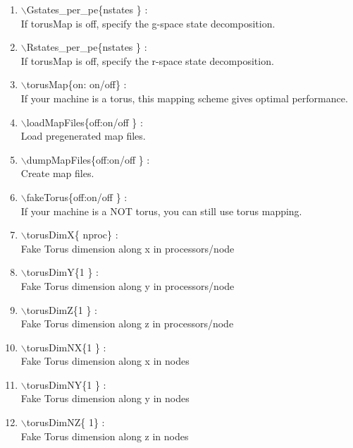 \documentclass[12pt]{article}
\begin{document}
\begin{enumerate}
  \vspace{0.15in} 
  \item $\backslash$Gstates\_per\_pe\{nstates \} : \\    
  If torusMap is off, specify the g-space state decomposition.
  \vspace{0.15in} 
  \item $\backslash$Rstates\_per\_pe\{nstates \} : \\    
  If torusMap is off, specify the r-space state decomposition.
  \vspace{0.15in} 
  \item $\backslash$torusMap\{on: on/off\} : \\    
  If your machine is a torus, this mapping scheme gives optimal performance.
  \vspace{0.15in} 
  \item $\backslash$loadMapFiles\{off:on/off \} : \\    
  Load pregenerated map files.
  \vspace{0.15in} 
  \item $\backslash$dumpMapFiles\{off:on/off \} : \\    
  Create map files.
  \vspace{0.15in} 
  \item $\backslash$fakeTorus\{off:on/off \} : \\    
  If your machine is a NOT torus, you can still use torus mapping.
  \vspace{0.15in} 
  \item $\backslash$torusDimX\{ nproc\} : \\    
  Fake Torus dimension along x in processors/node
  \vspace{0.15in} 
  \item $\backslash$torusDimY\{1 \} : \\    
  Fake Torus dimension along y in processors/node
  \vspace{0.15in} 
  \item $\backslash$torusDimZ\{1 \} : \\    
  Fake Torus dimension along z in processors/node
  \vspace{0.15in} 
  \item $\backslash$torusDimNX\{1 \} : \\    
  Fake Torus dimension along x in nodes
  \vspace{0.15in} 
  \item $\backslash$torusDimNY\{1 \} : \\    
  Fake Torus dimension along y in nodes
  \vspace{0.15in} 
  \item $\backslash$torusDimNZ\{ 1\} : \\    
  Fake Torus dimension along z in nodes
\end{enumerate}



\end{document}
